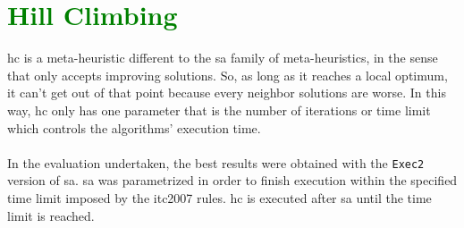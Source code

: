 \section{\textcolor{green}{Hill Climbing}}
\label{sec:HillClimbing}

\gls{hc} is a meta-heuristic different to the \gls{sa} family of meta-heuristics, in the sense that only accepts improving solutions. So, as long as it reaches a local optimum, it can't get out of that point because every neighbor solutions are worse. In this way, \gls{hc} only has one parameter that is the number of iterations or time limit which controls the algorithms' execution time.\\
\\
In the evaluation undertaken, the best results were obtained with the \verb+Exec2+ version of \gls{sa}. \gls{sa} was parametrized in order to finish execution within the specified time limit imposed by the \gls{itc2007} rules. \gls{hc} is executed after \gls{sa} until the time limit is reached.

